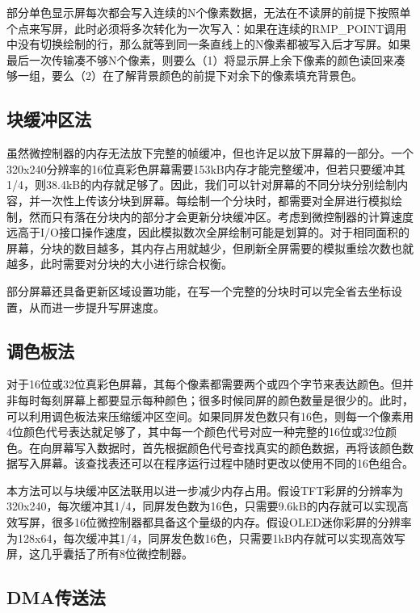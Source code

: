 部分单色显示屏每次都会写入连续的N个像素数据，无法在不读屏的前提下按照单个点来写屏，此时必须将多次转化为一次写入：如果在连续的RMP\_POINT调用中没有切换绘制的行，那么就等到同一条直线上的N像素都被写入后才写屏。如果最后一次传输凑不够N个像素，则要么（1）将显示屏上余下像素的颜色读回来凑够一组，要么（2）在了解背景颜色的前提下对余下的像素填充背景色。

\subsection{块缓冲区法}\label{subsec:block-buffering}

虽然微控制器的内存无法放下完整的帧缓冲，但也许足以放下屏幕的一部分。一个320x240分辨率的16位真彩色屏幕需要153kB内存才能完整缓冲，但若只要缓冲其1/4，则38.4kB的内存就足够了。因此，我们可以针对屏幕的不同分块分别绘制内容，并一次性上传该分块到屏幕。每绘制一个分块时，都需要对全屏进行模拟绘制，然而只有落在分块内的部分才会更新分块缓冲区。考虑到微控制器的计算速度远高于I/O接口操作速度，因此模拟数次全屏绘制可能是划算的。对于相同面积的屏幕，分块的数目越多，其内存占用就越少，但刷新全屏需要的模拟重绘次数也就越多，此时需要对分块的大小进行综合权衡。

部分屏幕还具备更新区域设置功能，在写一个完整的分块时可以完全省去坐标设置，从而进一步提升写屏速度。

\subsection{调色板法}\label{subsec:palette-method}

对于16位或32位真彩色屏幕，其每个像素都需要两个或四个字节来表达颜色。但并非每时每刻屏幕上都要显示每种颜色；很多时候同屏的颜色数量是很少的。此时，可以利用调色板法来压缩缓冲区空间。如果同屏发色数只有16色，则每一个像素用4位颜色代号表达就足够了，其中每一个颜色代号对应一种完整的16位或32位颜色。在向屏幕写入数据时，首先根据颜色代号查找真实的颜色数据，再将该颜色数据写入屏幕。该查找表还可以在程序运行过程中随时更改以使用不同的16色组合。

本方法可以与块缓冲区法联用以进一步减少内存占用。假设TFT彩屏的分辨率为320x240，每次缓冲其1/4，同屏发色数为16色，只需要9.6kB的内存就可以实现高效写屏，很多16位微控制器都具备这个量级的内存。假设OLED迷你彩屏的分辨率为128x64，每次缓冲其1/4，同屏发色数16色，只需要1kB内存就可以实现高效写屏，这几乎囊括了所有8位微控制器。

\subsection{DMA传送法}\label{subsec:dma-transfer}

